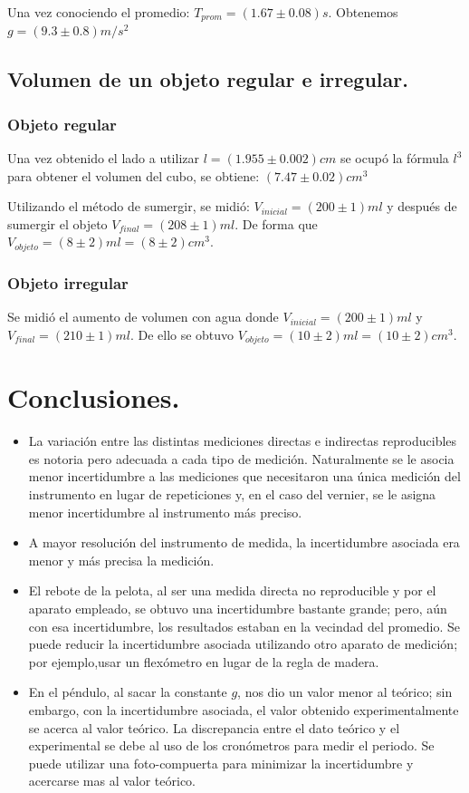 \documentclass{article}
\begin{document}
Una vez conociendo el promedio: $T_{prom} = (1.67 \pm 0.08)s$. Obtenemos $g = (9.3\pm0.8)m/s^2$

\subsection{Volumen de un objeto regular e irregular.}
\subsubsection*{Objeto regular}
Una vez obtenido el lado a utilizar $l = (1.955\pm0.002)cm$ se ocupó la fórmula $l^3$ para obtener el volumen del cubo, se obtiene: $(7.47\pm0.02)cm^3$

Utilizando el método de sumergir, se midió: $V_{inicial} = (200\pm1)ml$ y después de sumergir el objeto $V_{final} = (208\pm1)ml$. De forma que $V_{objeto} = (8\pm2)ml = (8\pm2)cm^3$. 

\subsubsection*{Objeto irregular}
Se midió el aumento de volumen con agua donde $V_{inicial} = (200\pm1)ml$ y $V_{final} = (210\pm1)ml$. De ello se obtuvo $V_{objeto} = (10\pm2)ml = (10\pm2)cm^3$.



\section{Conclusiones.}
\begin{itemize}
    \item La variación entre las distintas mediciones directas e indirectas reproducibles es notoria pero adecuada a cada tipo de medición. Naturalmente se le asocia menor incertidumbre a las mediciones que necesitaron una única medición del instrumento en lugar de repeticiones y, en el caso del vernier, se le asigna menor incertidumbre al instrumento más preciso. 
    \item A mayor resolución del instrumento de medida, la incertidumbre asociada era menor y más precisa la medición.
    \item El rebote de la pelota, al ser una medida directa no reproducible y por el aparato empleado, se obtuvo una incertidumbre bastante grande; pero, aún con esa incertidumbre, los resultados estaban en la vecindad del promedio. Se puede reducir la incertidumbre asociada utilizando otro aparato de medición; por ejemplo,usar un flexómetro en lugar de la regla de madera.  
    \item En el péndulo, al sacar la constante $g$, nos dio un valor menor al teórico; sin embargo, con la incertidumbre asociada, el valor obtenido experimentalmente se acerca al valor teórico. La discrepancia entre el dato teórico y el experimental se debe al uso de los cronómetros para medir el periodo. Se puede utilizar una foto-compuerta para minimizar la incertidumbre y acercarse mas al valor teórico.
    
\end{itemize}
\end{document}

